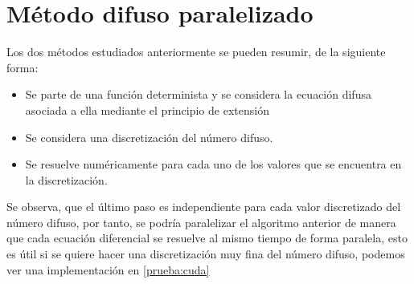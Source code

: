 \section{Método difuso paralelizado}
Los dos métodos estudiados anteriormente se pueden resumir, de la siguiente forma:
\begin{itemize}
	\item Se parte de una función determinista y se considera la ecuación difusa asociada a ella mediante el principio de extensión
		
	\item Se considera una discretización del número difuso.
	
	\item Se resuelve numéricamente para cada uno de los valores que se encuentra en la discretización.
\end{itemize}
Se observa, que el último paso es independiente para cada valor discretizado del número difuso, por tanto, se podría paralelizar el algoritmo anterior de manera que cada ecuación diferencial se resuelve al mismo tiempo de forma paralela, esto es útil si se quiere hacer una discretización muy fina del número difuso, podemos ver una implementación en \ref{prueba:cuda}